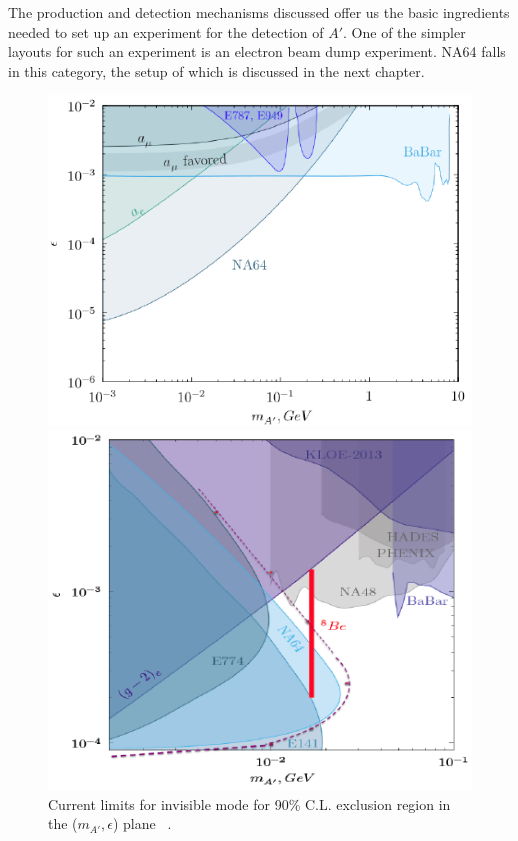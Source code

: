 The production and detection mechanisms discussed offer us the basic ingredients needed to set up an experiment for the detection of $A'$. One of the simpler layouts for such an experiment is an electron beam dump experiment. NA64 falls in this category, the setup of which is discussed in the next chapter.
\begin{figure}[t!]
\centering
  \begin{minipage}[t]{.45\textwidth}
    \centering
    \includegraphics[width=\textwidth]{thesis_figures/exclusion_invisible.png}
    \caption{Current limits for invisible mode for 90\% C.L. exclusion region in the ($m_{A'},\epsilon$) plane ~\cite{2019EPJWC.21206005K}.}
    \label{fig:exclusion_invisible}
  \end{minipage}
  \hfill
  \begin{minipage}[t]{.45\textwidth}
    \centering
    \includegraphics[width=\linewidth]{thesis_figures/exclusion_visible_latest.png}

\end{minipage}
\end{figure}
